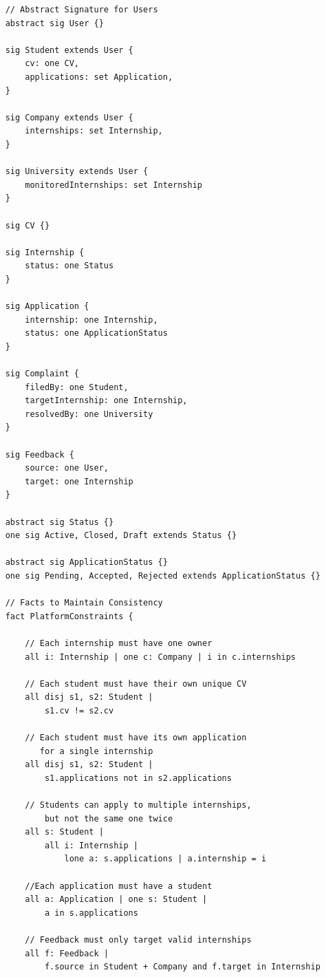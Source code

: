 \begin{verbatim}
    // Abstract Signature for Users
    abstract sig User {}
    
    sig Student extends User {
        cv: one CV,
        applications: set Application,
    }
    
    sig Company extends User {
        internships: set Internship,
    }
    
    sig University extends User {
    	monitoredInternships: set Internship
    }
    
    sig CV {}
    
    sig Internship {
        status: one Status
    }
    
    sig Application {
        internship: one Internship,
        status: one ApplicationStatus
    }
    
    sig Complaint {
        filedBy: one Student,
        targetInternship: one Internship,
        resolvedBy: one University
    }
    
    sig Feedback {
        source: one User,
        target: one Internship
    }
    
    abstract sig Status {}
    one sig Active, Closed, Draft extends Status {}
    
    abstract sig ApplicationStatus {}
    one sig Pending, Accepted, Rejected extends ApplicationStatus {}
    
    // Facts to Maintain Consistency
    fact PlatformConstraints {
    
        // Each internship must have one owner
        all i: Internship | one c: Company | i in c.internships
    
        // Each student must have their own unique CV
        all disj s1, s2: Student |
            s1.cv != s2.cv
    
        // Each student must have its own application 
           for a single internship
        all disj s1, s2: Student |
            s1.applications not in s2.applications
    
        // Students can apply to multiple internships, 
            but not the same one twice
        all s: Student |
            all i: Internship |
                lone a: s.applications | a.internship = i
    
        //Each application must have a student
        all a: Application | one s: Student |
            a in s.applications 
    
        // Feedback must only target valid internships
        all f: Feedback |
            f.source in Student + Company and f.target in Internship
    

\end{verbatim}
